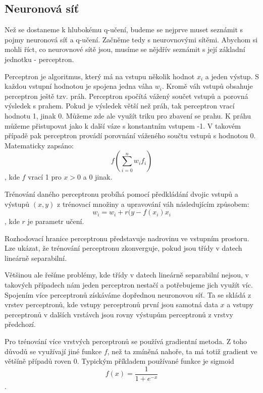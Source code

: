 \subsection{Neuronová síť}
Než se dostaneme k hlubokému q-učení, budeme se nejprve muset seznámit s pojmy neuronová síť a q-učení. Začněme tedy s neurovnovými sítěmi.
Abychom si mohli říct, co neurovnové sítě jsou, musíme se nějdřív seznámit s její základní jednotku - perceptron.
\par
Perceptron je algoritmus, který má na vstupu několik hodnot $x_i$ a jeden výstup. S každou vstupní hodnotou je spojena jedna váha $w_i$.
Kromě váh vstupů obsahuje perceptron ještě tzv. práh. Perceptron spočítá vážený součet vstupů a porovná výsledek s prahem. Pokud je výsledek větší než práh, tak perceptron vrací hodnotu 1, jinak 0.
Můžeme zde ale využít triku pro zbavení se prahu. K práhu můžeme přistupovat jako k další váze s konstantním vstupem -1.
V takovém případě pak perceptron provádí porovnání váženého součtu vstupů s hodnotou 0. 
\newline
Matematicky zapsáno:
\[f(\sum_{i=0}^{n} w_if_i)\], kde $f$ vrací 1 pro $x>0$ a 0 jinak.

Trénování daného perceptronu probíhá pomocí předkládání dvojic vstupů a výstupů $(x,y)$ z trénovací množiny a upravování váh následujícím způsobem:
\newline
\[w_i = w_i + r(y-f(x_i)x_i\], kde $r$ je parametr učení.

Rozhodovací hranice perceptronu představuje nadrovinu ve vstupním prostoru. Lze ukázat, že trénování perceptronu zkonverguje, pokud jsou třídy v datech lineárně separabilní.

Většinou ale řešíme problémy, kde třídy v datech lineárně separabilní nejsou, v takových případech nám jeden perceptron nestačí a potřebujeme jich využít víc.
Spojením více perceptronů získáváme dopřednou neuronovou síť. Ta se skládá z vrstev perceptronů, kde vstupy perceptronů první jsou samotná data $x$ a vstupy perceptronů v dalších vrstávch jsou rovny výstupům perceptronů z vrstvy předchozí.

Pro trénování více vrstvých perceptronů se používá gradientní metoda. Z toho důvodů se využívají jiné funkce $f$, než ta zmíněná nahoře, ta má totiž gradient ve většíně případů roven 0.
Typickým příkladem používané funkce je sigmoid \[f(x) = \frac{1}{1+e^{-x}}\].

